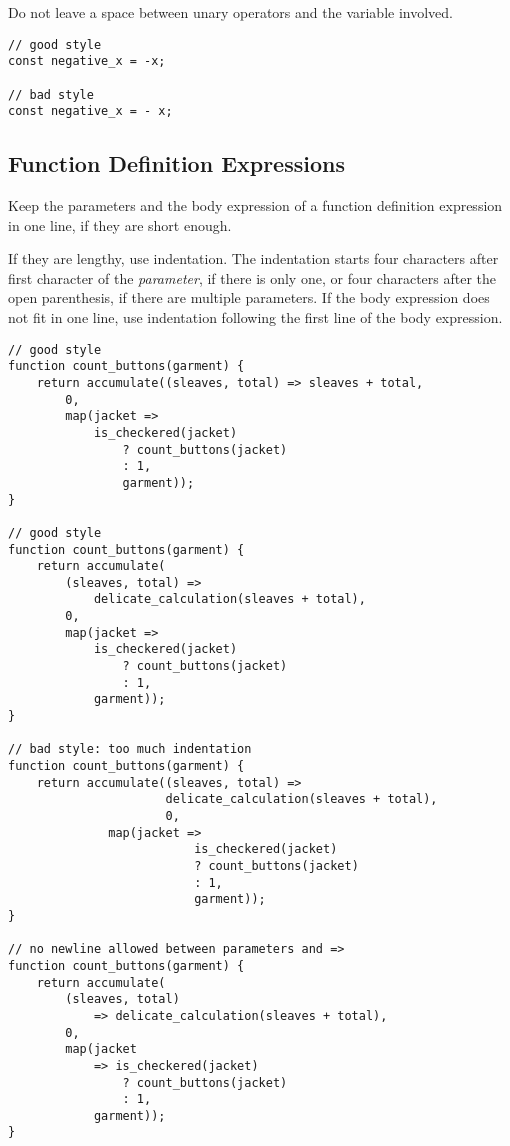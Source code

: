 	Do not leave a space between unary operators and the variable involved.

\begin{lstlisting}
// good style
const negative_x = -x;

// bad style
const negative_x = - x;
\end{lstlisting}

\subsection*{Function Definition Expressions}

Keep the parameters and the body expression of a function definition expression
in one line, if they are short enough.

If they are lengthy, use
indentation. The indentation starts four characters after first character of
the \textit{parameter}, if there is only one,
or four characters after the open parenthesis,
if there are multiple parameters. If the body expression does not
fit in one line, use indentation following the first line of the body
expression. 

\begin{lstlisting}
// good style
function count_buttons(garment) {
    return accumulate((sleaves, total) => sleaves + total,
        0, 
        map(jacket =>
            is_checkered(jacket)
                ? count_buttons(jacket)
                : 1,
                garment));
}

// good style
function count_buttons(garment) {
    return accumulate(
        (sleaves, total) =>
            delicate_calculation(sleaves + total),
        0,
        map(jacket =>
            is_checkered(jacket)
                ? count_buttons(jacket)
                : 1,
            garment));
}

// bad style: too much indentation
function count_buttons(garment) {
    return accumulate((sleaves, total) =>
                      delicate_calculation(sleaves + total),
                      0, 
		      map(jacket =>
                          is_checkered(jacket)
                          ? count_buttons(jacket)
                          : 1,
                          garment));
}

// no newline allowed between parameters and =>
function count_buttons(garment) {
    return accumulate(
        (sleaves, total) 
            => delicate_calculation(sleaves + total),
        0,
        map(jacket 
            => is_checkered(jacket)
                ? count_buttons(jacket)
                : 1,
            garment));
}
\end{lstlisting}


